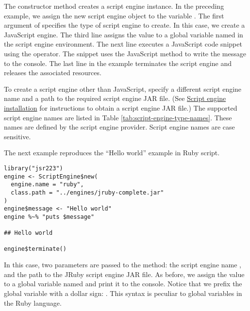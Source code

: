 The  constructor method creates a script engine instance. In the preceding example, we assign the new script engine object to the variable . The first argument of  specifies the type of script engine to create. In this case, we create a JavaScript engine. The third line assigns the value  to a global variable named  in the script engine environment. The next line executes a JavaScript code snippet using the \code{\%$\sim$\%} operator. The snippet uses the JavaScript  method to write the message to the console. The last line in the example terminates the script engine and releases the associated resources.

To create a script engine other than JavaScript, specify a different script engine name and a path to the required script engine JAR file. (See \hyperlink{scriptengineinstallation}{Script engine installation} for instructions to obtain a script engine JAR file.) The supported script engine names are listed in Table \ref{tab:script-engine-type-names}. These names are defined by the script engine provider.  Script engine names are case sensitive.

The next example reproduces the “Hello world” example in Ruby script.

\begin{verbatim}
library("jsr223")
engine <- ScriptEngine$new(
  engine.name = "ruby",
  class.path = "../engines/jruby-complete.jar"
)
engine$message <- "Hello world"
engine %~% "puts $message"

## Hello world

engine$terminate()
\end{verbatim}

In this case, two parameters are passed to the  method: the script engine name , and the path to the JRuby script engine JAR file. As before, we assign the value  to a global variable named  and print it to the console. Notice that we prefix the global variable with a dollar sign: . This syntax is peculiar to global variables in the Ruby language.

